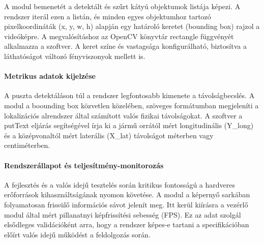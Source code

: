 A modul bemenetét a detektált és szűrt kátyú objektumok listája képezi.
A rendszer iterál ezen a listán, és minden egyes objektumhoz tartozó
pixelkoordináták (x, y, w, h) alapján egy határoló keretet (bounding
box) rajzol a videóképre. A megvalósításhoz az OpenCV könyvtár rectangle
függvényét alkalmazza a szoftver. A keret színe és vastagsága
konfigurálható, biztosítva a láthatóságot változó fényviszonyok mellett
is.

\paragraph{Metrikus adatok kijelzése}

A puszta detektáláson túl a rendszer legfontosabb kimenete a
távolságbecslés. A modul a boounding box közvetlen közelében, szöveges
formátumban megjeleníti a lokalizációs alrendszer által számított valós
fizikai távolságokat. A szoftver a putText eljárás segítségével írja ki
a jármű orrától mért longitudinális (Y\_long) és a középvonaltól mért
laterális (X\_lat) távolságot méterben vagy centiméterben.

\paragraph{Rendszerállapot és teljesítmény-monitorozás}

A fejlesztés és a valós idejű tesztelés során kritikus fontosságú a
hardveres erőforrások kihasználtságának nyomon követése. A modul a
képernyő sarkában folyamatosan frissülő információs sávot jelenít meg.
Itt kerül kiírásra a vezérlő modul által mért pillanatnyi képfrissítési
sebesség (FPS). Ez az adat szolgál elsődleges validációként arra, hogy a
rendszer képes-e tartani a specifikációban előírt valós idejű működést a
feldolgozás során.